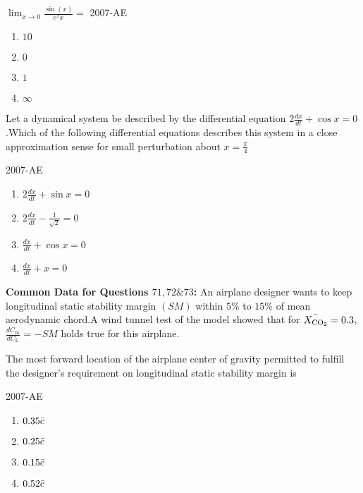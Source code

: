 \iffalse
\chapter{2007}
\author{ee24btech11056}
\section{ae}
\fi
\item $\lim_{x \to 0} \frac{\sin(x)}{e^xx} = $
\hfill{2007-AE}
\begin{enumerate}
    \item $10$
    \item $0$
    \item $1$
    \item $\infty$\\
\end{enumerate}
\item Let a dynamical system be described by the differential equation $2\frac{dx}{dt} + \cos{x} = 0$.Which of the following differential equations describes this system in a close approximation sense for small perturbation about $x = \frac{\pi}{4}$

\hfill{2007-AE}

\begin{enumerate}
    \item $2\frac{dx}{dt} + \sin{x} = 0$
    \item $2\frac{dx}{dt} - \frac{1}{\sqrt{2}} = 0$
    \item $\frac{dx}{dt} + \cos{x} = 0$
    \item $\frac{dx}{dt} + x = 0$\\
\end{enumerate}

\textbf{Common Data for Questions $71, 72 \& 73$:} An airplane designer wants to keep longitudinal static stability margin $(SM)$ within $5\%$ to $15\%$ of mean  aerodynamic chord.A wind tunnel test of the model showed that for $\Bar{X_{\text{CO}_2}} = 0.3$,$\frac{dC_{\text{m}}}{dC_{\text{L}}}$ = $-SM$ holds true for this airplane.\\

\item  The most forward location of the airplane  center of gravity permitted to fulfill the designer's requirement on longitudinal static stability margin is

\hfill{2007-AE}

\begin{enumerate}
    \item $0.35 \Bar{c}$
    \item $0.25 \Bar{c}$
    \item $0.15 \Bar{c}$
    \item $0.52 \Bar{c}$\\
\end{enumerate}

